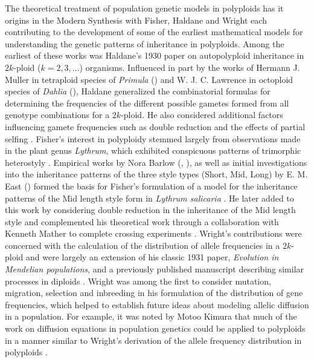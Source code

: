 \documentclass[11pt,english,letterpaper,oneside]{article}
\begin{document}
The theoretical treatment of population genetic models in polyploids has it origins in the Modern Synthesis with  Fisher, Haldane and Wright each contributing to the development of some of the earliest mathematical models for understanding the genetic patterns of inheritance in polyploids. Among the earliest of these works was Haldane's 1930 paper on autopolyploid inheritance in $2k$-ploid ($k=2,3,\dots$) organisms. Influenced in part by the works of Hermann J. Muller in tetraploid species of \textit{Primula} (\citeyear{muller1914primula}) and W. J. C. Lawrence in octoploid species of \textit{Dahlia} (\citeyear{lawrence1929dahlia}), Haldane generalized the combinatorial formulas for determining the frequencies of the different possible gametes formed from all genotype combinations for a $2k$-ploid. He also considered additional factors influencing gamete frequencies such as double reduction and the effects of partial selfing \citep{haldane1930autopolyploids}. Fisher's interest in polyploidy stemmed largely from observations made in the plant genus \textit{Lythrum}, which exhibited conspicuous patterns of trimorphic heterostyly \citep{fisher1941lythrum}. Empirical works by Nora Barlow (\citeyear{barlow1913heterostylism}, \citeyear{barlow1923trimorphic}), as well as initial investigations into the inheritance patterns of the three style types (Short, Mid, Long) by E. M. East (\citeyear{east1927lythrum}) formed the basis for Fisher's formulation of a model for the inheritance patterns of the Mid length style form in \textit{Lythrum salicaria} \citep{fisher1941lythrum}. He later added to this work by considering double reduction in the inheritance of the Mid length style and complemented his theoretical work through a collaboration with Kenneth Mather to complete crossing experiments \citep{fisher1943doublereduction,fisher1943mather}. Wright's contributions were concerned with the calculation of the distribution of allele frequencies in a $2k$-ploid and were largely an extension of his classic 1931 paper, \textit{Evolution in Mendelian populations}, and a previously published manuscript describing similar processes in diploids \citep{wright1931mendelianPops,wright1937geneFreqs,wright1938polyploid}. Wright was among the first to consider mutation, migration, selection and inbreeding in his formulation of the distribution of gene frequencies, which helped to establish future ideas about modeling allelic diffusion in a population. For example, it was noted by Motoo Kimura that much of the work on diffusion equations in population genetics could be applied to polyploids in a manner similar to Wright's derivation of the allele frequency distribution in polyploids \citep{kimura1964diffusion}.
\medskip
\end{document}

